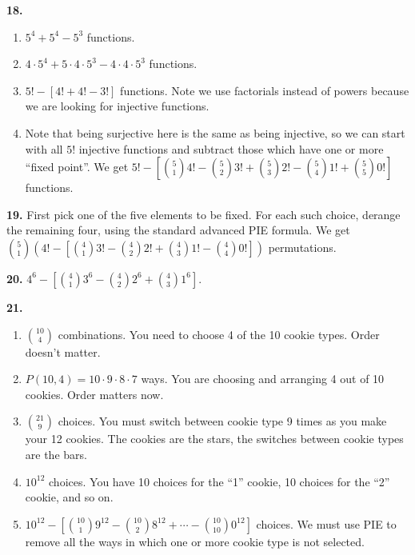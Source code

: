\documentclass[10pt,]{book}
\theoremstyle{plain}
\theoremstyle{definition}
\theoremstyle{definition}
\theoremstyle{definition}
\numberwithin{equation}{chapter}
\begin{document}
\par\smallskip
\noindent\textbf{18.}\quad{}
          \leavevmode%
\begin{enumerate}[label=(\alph*)]
\item\hypertarget{li-757}{}\(5^4 + 5^4 - 5^3\) functions. %
\item\hypertarget{li-758}{}\(4\cdot 5^4 + 5 \cdot 4 \cdot 5^3 - 4 \cdot 4 \cdot 5^3\) functions.%
\item\hypertarget{li-759}{}\(5! - \left[ 4! + 4! - 3! \right]\) functions.  Note we use factorials instead of powers because we are looking for injective functions.%
\item\hypertarget{li-760}{}Note that being surjective here is the same as being injective, so we can start with all \(5!\) injective functions and subtract those which have one or more ``fixed point''.  We get \(5! - \left[{5 \choose 1}4! - {5 \choose 2}3! + {5 \choose 3}2! - {5 \choose 4}1! + {5 \choose 5} 0!\right]\) functions.%
\end{enumerate}

\par\smallskip
\noindent\textbf{19.}\quad{} First pick one of the five elements to be fixed.  For each such choice, derange the remaining four, using the standard advanced PIE formula.  We get
            \({5 \choose 1}\left( 4! - \left[{4 \choose 1}3! - {4 \choose 2}2! + {4 \choose 3} 1! - {4 \choose 4} 0!\right] \right)\) permutations.
\par\smallskip
\noindent\textbf{20.}\quad{}
            \(4^6 - \left[{4 \choose 1}3^6 - {4 \choose 2}2^6 + {4 \choose 3} 1^6 \right]\).
\par\smallskip
\noindent\textbf{21.}\quad{}
          \leavevmode%
\begin{enumerate}[label=(\alph*)]
\item\hypertarget{li-766}{}\({10 \choose 4}\) combinations. You need to choose 4 of the 10 cookie types. Order doesn't matter.%
\item\hypertarget{li-767}{}\(P(10, 4) = 10 \cdot 9 \cdot 8 \cdot 7\) ways. You are choosing and arranging 4 out of 10 cookies. Order matters now.%
\item\hypertarget{li-768}{}\({21 \choose 9}\) choices. You must switch between cookie type 9 times as you make your 12 cookies. The cookies are the stars, the switches between cookie types are the bars.%
\item\hypertarget{li-769}{}\(10^{12}\) choices. You have 10 choices for the ``1'' cookie, 10 choices for the ``2'' cookie, and so on.%
\item\hypertarget{li-770}{}\(10^{12} - \left[{10 \choose 1}9^{12} - {10 \choose 2}8^{12} + \cdots - {10 \choose 10}0^{12}   \right]\) choices. We must use PIE to remove all the ways in which one or more cookie type is not selected.%
\end{enumerate}
\end{document}
